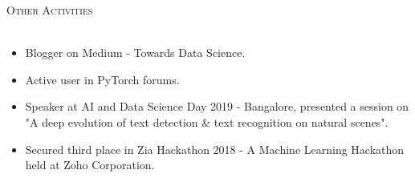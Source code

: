 \documentclass[a4paper]{article}
\newcommand{\lineunder} {
    \vspace*{-8pt} \\
    \hspace*{-18pt} \hrulefill \\
}
\newcommand{\header} [1] {
    {\hspace*{-18pt}\vspace*{6pt} \textsc{#1}}
    \vspace*{-6pt} \lineunder
}
\begin{document}
\header{Other Activities}
    \begin{itemize}
    \item Blogger on Medium - Towards Data Science.
    \item Active user in PyTorch forums.
    \item Speaker at AI and Data Science Day 2019 - Bangalore, presented a session on "A deep evolution of text detection \& text recognition on natural scenes".
    \item Secured third place in Zia Hackathon 2018 - A Machine Learning Hackathon held at Zoho Corporation.
    \end{itemize}

\vspace*{2mm}
\end{document}
